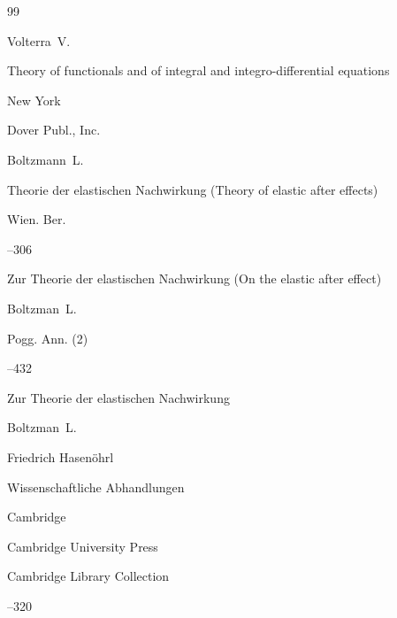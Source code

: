 \begin{thebibliography}{99}

\by Volterra~V.

\book Theory of functionals and of integral and integro-differential equations

\publaddr New York

\publ Dover Publ., Inc. 









\by Boltzmann~L.

\paper Theorie der elastischen Nachwirkung (Theory of elastic after effects)


\jour Wien. Ber.



–306\!\!

\moreref

\paper 	Zur Theorie der elastischen Nachwirkung (On the elastic after effect)

\by    Boltzman~L.


\jour Pogg. Ann. \rm (2)


--432\!\! 


\moreref

\paper 	Zur Theorie der elastischen Nachwirkung 

\by    Boltzman~L.

\ed  Friedrich Hasen\"ohrl

\inbook Wissenschaftliche Abhandlungen


\publaddr Cambridge

\publ Cambridge University Press


\serial Cambridge Library Collection

--320







\end{thebibliography}
